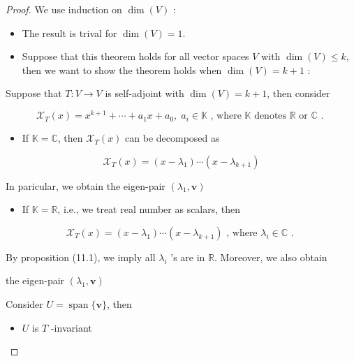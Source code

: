 \documentclass[11pt]{article}
\begin{document}
\begin{proof} We use induction on \(\dim \left( V\right)\) :

\begin{itemize}
\item The result is trival for \(\dim \left( V\right)  = 1\).
\end{itemize}

\begin{itemize}
\item Suppose that this theorem holds for all vector spaces \(V\) with \(\dim \left( V\right)  \leq  k\), then we want to show the theorem holds when \(\dim \left( V\right)  = k + 1\) :
\end{itemize}

Suppose that \(T : V \rightarrow  V\) is self-adjoint with \(\dim \left( V\right)  = k + 1\), then consider

\[
{\mathcal{X}}_{T}\left( x\right)  = {x}^{k + 1} + \cdots  + {a}_1x + {a}_{0},\;{a}_{i} \in  \mathbb{K}\text{ , where }\mathbb{K}\text{ denotes }\mathbb{R}\text{ or }\mathbb{C}\text{ . }
\]

\begin{itemize}
\item If \(\mathbb{K} = \mathbb{C}\), then \({\mathcal{X}}_{T}\left( x\right)\) can be decomposed as
\end{itemize}

\[
{\mathcal{X}}_{T}\left( x\right)  = \left( {x - {\lambda }_1}\right) \cdots \left( {x - {\lambda }_{k + 1}}\right)
\]

In paricular, we obtain the eigen-pair \(\left( {{\lambda }_1,\mathbf{v}}\right)\)

\begin{itemize}
\item If \(\mathbb{K} = \mathbb{R}\), i.e., we treat real number as scalars, then
\end{itemize}

\[
{\mathcal{X}}_{T}\left( x\right)  = \left( {x - {\lambda }_1}\right) \cdots \left( {x - {\lambda }_{k + 1}}\right) \text{ , where }{\lambda }_{i} \in  \mathbb{C}\text{ . }
\]

By proposition (11.1), we imply all \({\lambda }_{i}\) ’s are in \(\mathbb{R}\). Moreover, we also obtain

the eigen-pair \(\left( {{\lambda }_1,\mathbf{v}}\right)\)

Consider \(U = \operatorname{span}\{ \mathbf{v}\}\), then

\begin{itemize}
\item \(U\) is \(T\) -invariant
\end{itemize}


\end{proof}
\end{document}
